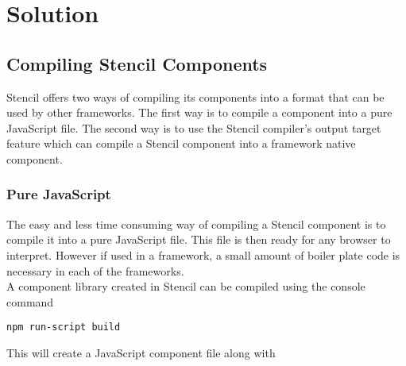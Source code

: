 \chapter{Solution}
\label{cha:solution}
\section{Compiling Stencil Components}
Stencil offers two ways of compiling its components into a format that can be used by other frameworks. The first way is to compile a component into a pure JavaScript file. The second way is to use the Stencil compiler's output target feature which can compile a Stencil component into a framework native component.

\subsection{Pure JavaScript}
The easy and less time consuming way of compiling a Stencil component is to compile it into a pure JavaScript file. This file is then ready for any browser to interpret. However if used in a framework, a small amount of boiler plate code is necessary in each of the frameworks.\\[0.5cm]
A component library created in Stencil can be compiled using the console command 
\begin{Verbatim}[frame=single]
 npm run-script build
\end{Verbatim}
This will create a JavaScript component file along with 
